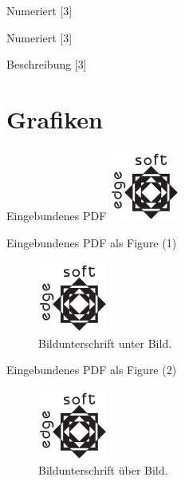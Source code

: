 \documentclass[aspectratio=169, ngerman]{beamer}
\begin{document}
	\begin{frame}{Numeriert}
		[3]
	\end{frame}

	\begin{frame}{Numeriert}
		[3]
	\end{frame}

	\begin{frame}{Beschreibung}
		[3]
	\end{frame}

	\section{Grafiken}

	\begin{frame}{Eingebundenes PDF}
		\includegraphics{testlogo}
	\end{frame}

	\begin{frame}{Eingebundenes PDF als Figure (1)}
		\begin{figure}
			\includegraphics{testlogo}
			\caption{Bildunterschrift unter Bild.}
		\end{figure}
	\end{frame}

	\begin{frame}{Eingebundenes PDF als Figure (2)}
		\begin{figure}
			\caption{Bildunterschrift über Bild.}
			\includegraphics{testlogo}
		\end{figure}
	\end{frame}
\end{document}
